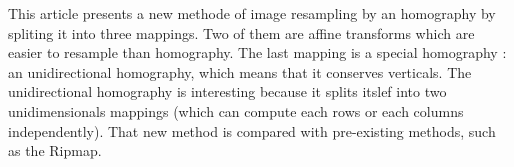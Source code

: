 This article presents a new methode of image resampling by an homography by spliting it into three mappings. Two of them are affine transforms which are easier to resample than homography. The last mapping is a special homography : an unidirectional homography, which means that it conserves verticals. The unidirectional homography is interesting because it splits itslef into two unidimensionals mappings (which can compute each rows or each columns independently). That new method is compared with pre-existing methods, such as the Ripmap.






